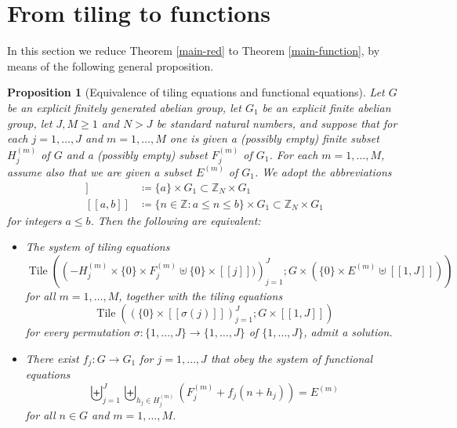 \documentclass[reqno,a4paper,12pt]{amsart}
\numberwithin{equation}{section}
\numberwithin{figure}{section}
\def\Z{\mathbb{Z}}
\renewcommand\leq{\leqslant}
\renewcommand\geq{\geqslant}
\newcommand{\Tile}{\operatorname{Tile}}
\theoremstyle{plain}
\newtheorem{proposition}[thm]{Proposition}
\theoremstyle{definition}
\begin{document}
\section{From tiling to functions}\label{function-sec}

In this section we reduce Theorem \ref{main-red} to Theorem \ref{main-function}, by means of the following general proposition.

\begin{proposition}[Equivalence of tiling equations and functional equations]\label{tile-function}  Let $G$ be an explicit finitely generated abelian group, let $G_1$ be an explicit finite abelian group, let $J, M \geq 1$ and $N > J$ be standard natural numbers, and suppose that for each $j=1,\dots,J$ and $m=1,\dots,M$ one is given a (possibly empty) finite subset $H_j^{(m)}$ of $G$ and a (possibly empty) subset $F_j^{(m)}$ of $G_1$.  For each $m=1,\dots,M$, assume also that we are given a subset $E^{(m)}$ of $G_1$.  We adopt the abbreviations
\begin{align*}
    [[a]] &\coloneqq \{a\} \times G_1 \subset \Z_N \times G_1 \\
    [[a,b]] &\coloneqq \{ n \in \Z: a\leq n \leq b\} \times G_1\subset \Z_N\times G_1
\end{align*} 
for integers $a \leq b$.  Then the following are equivalent:
\begin{itemize}
\item[(i)]  The system of tiling equations
\begin{equation}\label{tile-1}
\Tile\left( \left( -H_j^{(m)} \times \{0\} \times F_j^{(m)} \uplus \{0\} \times [[j]])\right)_{j=1}^J; G \times (\{0\} \times E^{(m)} \uplus [[1,J]]) \right)
\end{equation}
for all $m=1,\dots,M$, together with the tiling equations
\begin{equation}\label{tile-2}
\Tile\left( \left( \{0\} \times [[\sigma(j)]] \right)_{j=1}^J; G \times [[1,J]] \right)
\end{equation}
for every permutation $\sigma \colon \{1,\dots,J\} \to \{1,\dots,J\}$ of $\{1,\dots,J\}$, admit a solution.
\item[(ii)]  There exist $f_j \colon G \to G_1$ for $j=1,\dots,J$ that obey the system of functional equations
\begin{equation}\label{func-eq-stack}
\biguplus_{j=1}^J \biguplus_{h_j \in H_j^{(m)}} (F_j^{(m)} + f_j(n+h_j)) = E^{(m)} 
\end{equation}
for all $n \in G$ and $m=1,\dots,M$.
\end{itemize}
\end{proposition}
\end{document}
